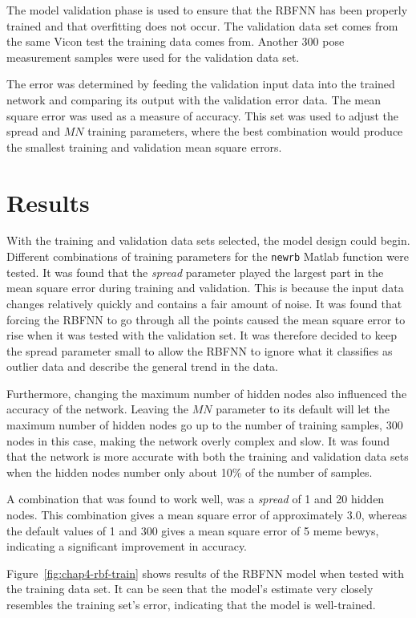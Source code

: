 The model validation phase is used to ensure that the RBFNN has been properly trained and that overfitting does not occur. The validation data set comes from the same Vicon test the training data comes from. Another 300 pose measurement samples were used for the validation data set. 

The error was determined by feeding the validation input data into the trained network and comparing its output with the validation error data. The mean square error was used as a measure of accuracy. This set was used to adjust the spread and $\mathit{MN}$ training parameters, where the best combination would produce the smallest training and validation mean square errors. 

\section{Results}

With the training and validation data sets selected, the model design could begin. Different combinations of training parameters for the \verb|newrb| Matlab function were tested. It was found that the \emph{spread} parameter played the largest part in the mean square error during training and validation. This is because the input data changes relatively quickly and contains a fair amount of noise. It was found that forcing the RBFNN to go through all the points caused the mean square error to rise when it was tested with the validation set. It was therefore decided to keep the spread parameter small to allow the RBFNN to ignore what it classifies as outlier data and describe the general trend in the data. 

Furthermore, changing the maximum number of hidden nodes also influenced the accuracy of the network. Leaving the $MN$ parameter to its default will let the maximum number of hidden nodes go up to the number of training samples, 300 nodes in this case, making the network overly complex and slow. It was found that the network is more accurate with both the training and validation data sets when the hidden nodes number only about 10\% of the number of samples. 

A combination that was found to work well, was a \emph{spread} of 1 and 20 hidden nodes. This combination gives a mean square error of approximately 3.0, whereas the default values of 1 and 300 gives a mean square error of 5 meme bewys, indicating a significant improvement in accuracy.   

Figure~\ref{fig:chap4-rbf-train} shows results of the RBFNN model when tested with the training data set. It can be seen that the model's estimate very closely resembles the training set's error, indicating that the model is well-trained. 

